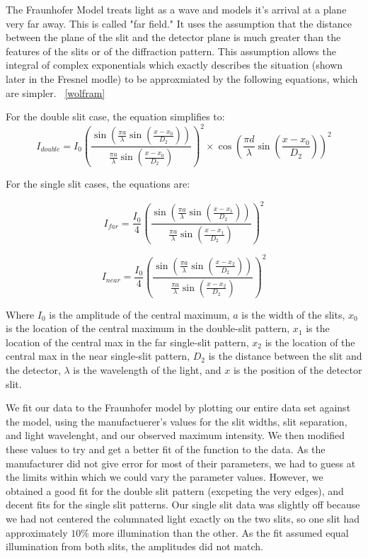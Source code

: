 \documentclass[prb,preprint]{revtex4-1}
\begin{document}
The Fraunhofer Model treats light as a wave and models it's arrival at a plane very far away. This is called "far field." It uses the assumption that the distance between the plane of the slit and the detector plane is much greater than the features of the slits or of the diffraction pattern.  This assumption allows the integral of complex exponentials which exactly describes the situation (shown later in the Fresnel modle) to be approxmiated by the following equations, which are simpler. ~\ref{wolfram}

For the double slit case, the equation simplifies to:
\begin{equation}
I_{double}= I_{0}(\frac{\sin(\frac{\pi a}{\lambda}\sin(\frac{x-x_{0}}{D_{2}}))}{\frac{\pi a}{\lambda}\sin(\frac{x-x_{0}}{D_{2}})})^{2} \times \cos(\frac{\pi d}{\lambda}\sin(\frac{x-x_{0}}{D_{2}}))^{2}
\end{equation}

For the single slit cases, the equations are: 

\begin{equation}
I_{far}= \frac{I_{0}}{4}(\frac{\sin(\frac{\pi a}{\lambda}\sin(\frac{x-x_{1}}{D_{2}}))}{\frac{\pi a}{\lambda}\sin(\frac{x-x_{1}}{D_{2}})})^{2} 
\end{equation}

\begin{equation}
I_{near}= \frac{I_{0}}{4}(\frac{\sin(\frac{\pi a}{\lambda}\sin(\frac{x-x_{2}}{D_{2}}))}{\frac{\pi a}{\lambda}\sin(\frac{x-x_{2}}{D_{2}})})^{2} 
\end{equation}

Where $I_0$ is the amplitude of the central maximum, $a$ is the width of the slits, $x_0$ is the location of the central maximum in the double-slit pattern, $x_1$ is the location of the central max in the far single-slit pattern, $x_2$ is the location of the central max in the near single-slit pattern, $D_2$ is the distance between the slit and the detector, $\lambda$ is the wavelength of the light, and $x$ is the position of the detector slit. 

We fit our data to the Fraunhofer model by plotting our entire data set against the model, using the manufactuerer's values for the slit widths, slit separation, and light wavelenght, and our observed maximum intensity.  We then modified these values to try and get a better fit of the function to the data.  As the manufacturer did not give error for most of their parameters, we had to guess at the limits within which we could vary the parameter values.  However, we obtained a good fit for the double slit pattern (excpeting the very edges), and decent fits for the single slit patterns.  Our single slit data was slightly off because we had not centered the columnated light exactly on the two slits, so one slit had approximately $10\%$ more illumination than the other.  As the fit assumed equal illumination from both slits, the amplitudes did not match.  
\end{document}
